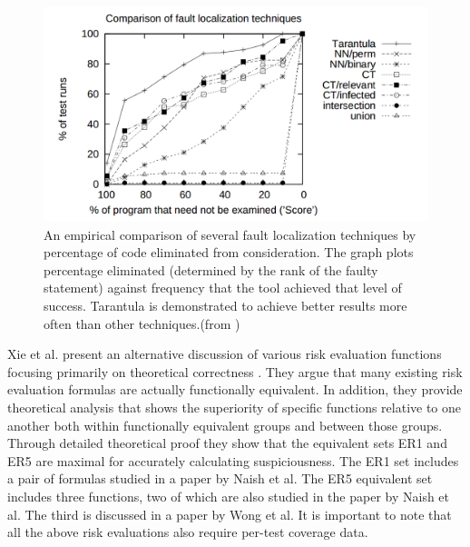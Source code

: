 \begin{figure}
  \centering
  \includegraphics[width=0.9\linewidth]{img/tareff.png}
  \caption{An empirical comparison of several fault localization
  techniques by percentage of code eliminated from consideration.  The
  graph plots percentage eliminated (determined by the rank of the
  faulty statement) against frequency that the tool achieved that level
  of success.  Tarantula is demonstrated to achieve better results more
  often than other techniques.(from \cite{harrold})}
  \label{tareval}
\end{figure}

Xie et al. present an alternative discussion of various risk evaluation 
functions focusing primarily on theoretical correctness \cite{theory}. They 
argue that many existing risk evaluation formulas are actually functionally
equivalent.  In addition, they provide theoretical analysis that shows the 
superiority of specific functions relative to one another both within 
functionally equivalent groups and between those groups. Through detailed
theoretical proof they show that the equivalent sets ER1 and ER5 are maximal
for accurately calculating suspiciousness.  The ER1 set includes a pair of 
formulas studied in a paper by Naish et al. \cite{naish}  The ER5 equivalent 
set includes three functions, two of which are also studied in the paper
by Naish et al. The third is discussed in a paper by Wong et al. \cite{wong}
It is important to note that all the above risk evaluations also require
per-test coverage data.


